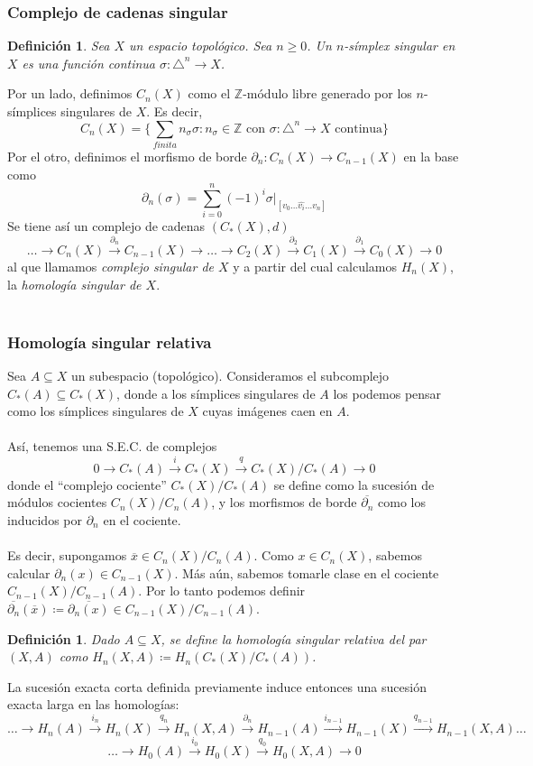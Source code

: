 \documentclass[12pt,a4paper]{article}
\newtheorem{definition}[theorem]{Definición}
\begin{document}
\subsubsection{Complejo de cadenas singular}
\begin{definition}    
Sea $X$ un espacio topológico. Sea $n \geq 0$. Un $n$-\textit{símplex singular} en $X$ es una función continua $\sigma: \triangle^n \rightarrow X$.
\end{definition}
Por un lado, definimos $C_n(X)$ como el $\mathbb{Z}$-módulo libre generado por los $n$-símplices singulares de $X$. Es decir,
\[
C_n(X) = \{\sum_{finita} n_\sigma\sigma : n_\sigma \in \mathbb{Z} \text{ con } \sigma: \triangle^n \rightarrow X \text{ continua}\}
\]
Por el otro, definimos el morfismo de borde $\partial_n : C_n(X) \rightarrow C_{n-1}(X)$ en la base como
\[
\partial_n(\sigma) = \sum_{i=0}
^n(-1)^i \sigma|_{[v_0 \ldots \hat{v_i} \ldots v_n]}
\]
Se tiene así un complejo de cadenas $(C_*(X), d)$
\[
\ldots \rightarrow C_n(X) \xrightarrow{\partial_n} C_{n-1}(X) \rightarrow \ldots \rightarrow C_2(X) \xrightarrow{\partial_2} C_1(X) \xrightarrow{\partial_1} C_0(X) \rightarrow 0
\]
al que llamamos \textit{complejo singular de $X$} y a partir del cual calculamos $H_n(X)$, la \textit{homología singular de $X$}.
\\
\\
\subsubsection{Homología singular relativa}
Sea $A \subseteq X$ un subespacio (topológico). Consideramos el subcomplejo $C_*(A) \subseteq C_*(X)$, donde a los símplices singulares de $A$ los podemos pensar como los símplices singulares de $X$ cuyas imágenes caen en $A$.
\\
\\
Así, tenemos una S.E.C. de complejos
\[
0 \rightarrow C_*(A) \xrightarrow{i} C_*(X) \xrightarrow{q} C_*(X)/C_*(A) \rightarrow 0
\]
donde el ``complejo cociente'' $C_*(X)/C_*(A)$ se define como la sucesión de módulos cocientes $C_n(X)/C_n(A)$, y los morfismos de borde $\overline{\partial_n}$ como los inducidos por $\partial_n$ en el cociente.
\\
\\
Es decir, supongamos $\overline{x} \in C_n(X)/C_n(A)$. Como $x \in C_n(X)$, sabemos calcular $\partial_n(x) \in C_{n-1}(X)$. Más aún, sabemos tomarle clase en el cociente $C_{n-1}(X)/C_{n-1}(A)$. Por lo tanto podemos definir $\overline{\partial_n}(\overline{x}) \coloneqq \overline{\partial_n(x)} \in C_{n-1}(X)/C_{n-1}(A)$.
\begin{definition}
Dado $A \subseteq X$, se define la \textit{homología singular relativa} del par $(X,A)$ como $H_n(X,A) \coloneqq H_n(C_*(X)/C_*(A))$.
\end{definition}
La sucesión exacta corta definida previamente induce entonces una sucesión exacta larga en las homologías:
\[
\ldots \rightarrow H_n(A) \xrightarrow{i_n} H_n(X) \xrightarrow{q_n} H_n(X,A) \xrightarrow{\partial_n} H_{n-1}(A) \xrightarrow{i_{n-1}} H_{n-1}(X) \xrightarrow{q_{n-1}} H_{n-1}(X,A) \ldots
\]
\[
\ldots \rightarrow H_0(A) \xrightarrow{i_0} H_0(X) \xrightarrow{q_0} H_0(X,A) \rightarrow 0
\]
\end{document}
